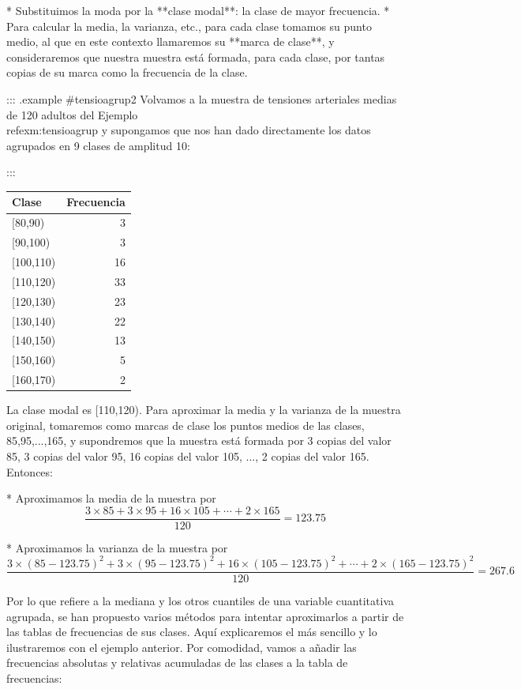 \documentclass[
]{book}
\theoremstyle{definition}
\theoremstyle{definition}
\theoremstyle{definition}
\theoremstyle{definition}
\theoremstyle{remark}
\begin{document}
* Substituimos la moda por la **clase modal**: la clase de mayor frecuencia.
* Para calcular la media, la varianza, etc., para cada clase tomamos su punto medio, al que en este contexto llamaremos su **marca de clase**, y consideraremos que nuestra muestra está formada, para cada clase, por tantas copias de su marca como la frecuencia de la clase.

::: {.example #tensioagrup2}
Volvamos a la muestra de tensiones arteriales medias de 120 adultos del Ejemplo \\ref{exm:tensioagrup} y supongamos que nos han dado directamente los datos agrupados en 9 clases de amplitud 10:

:::

\begin{table}
\centering
\begin{tabular}{l|r}
\hline
Clase & Frecuencia\\
\hline
[80,90) & 3\\
\hline
[90,100) & 3\\
\hline
[100,110) & 16\\
\hline
[110,120) & 33\\
\hline
[120,130) & 23\\
\hline
[130,140) & 22\\
\hline
[140,150) & 13\\
\hline
[150,160) & 5\\
\hline
[160,170) & 2\\
\hline
\end{tabular}
\end{table}

La clase modal es [110,120). Para aproximar la media y la varianza de la muestra original, tomaremos como marcas de clase los puntos medios de las clases, 85,95,...,165, y supondremos que la muestra está formada por 3 copias del valor 85, 3 copias del valor 95, 16 copias del valor 105, ..., 2 copias del valor 165. Entonces:

* Aproximamos la media de la muestra por
$$
\frac{3\times 85+3\times 95+16\times 105+\cdots+2\times 165}{120}=123.75
$$

* Aproximamos la varianza de la muestra por
$$
\frac{3\times (85-123.75)^2+3\times (95-123.75)^2+16\times (105-123.75)^2+\cdots+2\times (165-123.75)^2}{120}=267.6
$$

Por lo que refiere a la mediana y los otros cuantiles de una variable cuantitativa agrupada, se han propuesto varios métodos para intentar aproximarlos  a partir de las tablas de frecuencias de sus clases. Aquí explicaremos el más sencillo y lo ilustraremos con el ejemplo anterior. Por comodidad, vamos a añadir las frecuencias absolutas y relativas acumuladas de las clases a la tabla de frecuencias:
\end{document}
